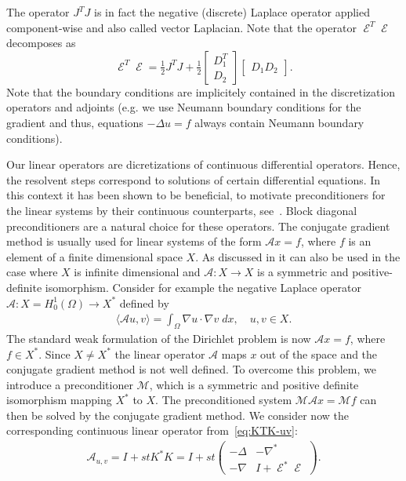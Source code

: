 \documentclass[twocolumn,envcountsame]{svjour3}
\newcommand{\laplace}{\Delta}
\newcommand{\MA}{\mathcal{A}}
\DeclareMathOperator{\symgrad}{\mathcal{E}}
\begin{document}
The operator $J^{T}J$ is in fact the negative (discrete) Laplace operator applied component-wise and also called vector Laplacian.
Note that the operator $\symgrad^{T}\symgrad$ decomposes as
\[
\symgrad^{T}\symgrad = \tfrac12 J^{T}J  + \tfrac12
\begin{bmatrix}
  D_{1}^{T}\\D_{2}
\end{bmatrix}
\begin{bmatrix}
  D_{1} D_{2}
\end{bmatrix}.
\]
Note that the boundary conditions are implicitely contained in the discretization operators and adjoints (e.g. we use Neumann boundary conditions for the gradient and thus, equations $-\laplace u = f$ always contain Neumann boundary conditions).

Our linear operators are dicretizations of continuous differential
operators. Hence, the resolvent steps correspond to solutions of certain differential equations.
In this context it has been shown to be beneficial, to motivate preconditioners for the linear systems by their continuous counterparts, see~\cite{mardal2011preconditioning}.
 Block diagonal
preconditioners are a natural choice for these operators. 
The conjugate gradient method is usually used for linear
systems of the form $\mathcal{A}x=f$, where $f$ is an element of a
finite dimensional space $X$. As discussed in
\cite{mardal2011preconditioning} it can also be used in the case where
$X$ is infinite dimensional and $\mathcal{A}:X\to X$ is a symmetric
and positive-definite isomorphism. Consider for example the negative
Laplace operator $\mathcal{A}: X=H_0^1(\Omega)\to X^*$ defined by
\begin{align*}
  \langle \mathcal{A} u,v\rangle = \int_{\Omega}\nabla u\cdot \nabla v\;dx,\quad u,v\in X.
\end{align*}
The standard weak formulation of the Dirichlet problem is now $\mathcal{A}x=f$, where $f\in X^*$. Since
$X\neq X^*$ the linear operator $\mathcal{A}$ maps $x$ out of the space and the conjugate
gradient method is not well defined. To overcome this problem, we introduce a preconditioner
$\mathcal{M}$, which is a symmetric and positive definite isomorphism mapping $X^*$ to $X$. The
preconditioned system $\mathcal{M}\mathcal{A}x=\mathcal{M}f$ can then be solved by the conjugate
gradient method. 
We consider now the corresponding continuous linear operator from~\eqref{eq:KTK-uv}:
\begin{align*}
  \MA_{u,v}=I+stK^*K = I + st\begin{pmatrix}-\Delta & -\nabla^*\\-\nabla &
    I+\symgrad^*\symgrad\end{pmatrix}.
\end{align*}
\end{document}
